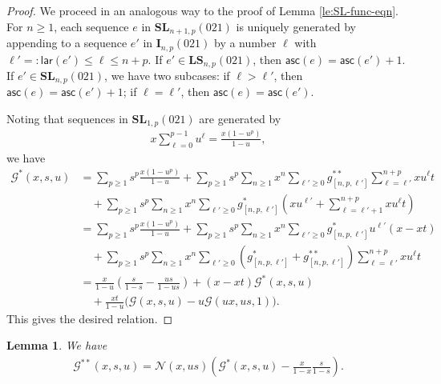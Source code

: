 \documentclass[reqno]{amsart}
\numberwithin{equation}{section}
\theoremstyle{plain}
\newtheorem{lemma}[theorem]{Lemma}
\theoremstyle{definition}
\theoremstyle{named}
\newcommand{\bI}{\mathbf{I}}
\newcommand{\bSL}{\mathbf{SL}}
\newcommand{\bLS}{\mathbf{LS}}
\newcommand{\asc}{\mathsf{asc}}
\newcommand{\lar}{\mathsf{lar}}
\newcommand{\cN}{\mathcal{N}}
\newcommand{\cG}{\mathcal{G}}
\begin{document}
\begin{proof}
	We proceed in an analogous way to the proof of Lemma \ref{le:SL-func-eqn}. For $n\ge 1$, each sequence $e$ in $\bSL_{n+1,p}(021)$ is uniquely generated by appending to a sequence $e'$ in $\bI_{n,p}(021)$ by a number $\ell$ with $\ell'=:\lar(e')\le \ell\le n+p$. If $e'\in \bLS_{n,p}(021)$, then $\asc(e)=\asc(e')+1$. If $e'\in \bSL_{n,p}(021)$, we have two subcases: if $\ell>\ell'$, then $\asc(e)=\asc(e')+1$; if $\ell=\ell'$, then $\asc(e)=\asc(e')$.
	
	Noting that sequences in $\bSL_{1,p}(021)$ are generated by
	\begin{align*}
		x\sum_{\ell=0}^{p-1}u^\ell=\frac{x(1-u^p)}{1-u},
	\end{align*}
	we have
	\begin{align*}
		\cG^*(x,s,u)&=\sum_{p\ge 1}s^p\frac{x(1-u^p)}{1-u}+\sum_{p\ge 1}s^p\sum_{n\ge 1}x^n\sum_{\ell'\ge 0}g^{**}_{[n,p,\ell']}\sum_{\ell=\ell'}^{n+p}xu^{\ell}t\\
		&\quad+\sum_{p\ge 1}s^p\sum_{n\ge 1}x^n\sum_{\ell'\ge 0}g^{*}_{[n,p,\ell']}\left(xu^{\ell'}+\sum_{\ell=\ell'+1}^{n+p}xu^{\ell}t\right)\\
		&=\sum_{p\ge 1}s^p\frac{x(1-u^p)}{1-u}+\sum_{p\ge 1}s^p\sum_{n\ge 1}x^n\sum_{\ell'\ge 0}g^{*}_{[n,p,\ell']}u^{\ell'}(x-xt)\\
		&\quad+\sum_{p\ge 1}s^p\sum_{n\ge 1}x^n\sum_{\ell'\ge 0}\left(g^{*}_{[n,p,\ell']}+g^{**}_{[n,p,\ell']}\right)\sum_{\ell=\ell'}^{n+p}xu^{\ell}t\\
		&=\frac{x}{1-u}\left(\frac{s}{1-s}-\frac{us}{1-us}\right)+(x-xt)\cG^*(x,s,u)\\
		&\quad +\frac{xt}{1-u}\big(\cG(x,s,u)-u\cG(ux,us,1)\big).
	\end{align*}
	This gives the desired relation.
\end{proof}

\begin{lemma}
	We have
	\begin{align}\label{eq:G**-func-eqn}
		\cG^{**}(x,s,u) = \cN(x,us)\left(\cG^*(x,s,u)-\frac{x}{1-x}\frac{s}{1-s}\right).
	\end{align}
\end{lemma}
\end{document}
